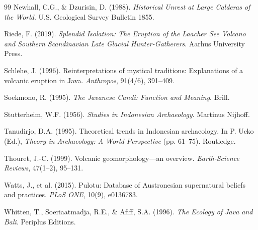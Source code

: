 \documentclass[12pt,a4paper]{article}
\begin{document}
\begin{thebibliography}{99}
Newhall, C.G., \& Dzurisin, D. (1988). \emph{Historical Unrest at Large Calderas of the World}. U.S. Geological Survey Bulletin 1855.

Riede, F. (2019). \emph{Splendid Isolation: The Eruption of the Laacher See Volcano and Southern Scandinavian Late Glacial Hunter-Gatherers}. Aarhus University Press.

Schlehe, J. (1996). Reinterpretations of mystical traditions: Explanations of a volcanic eruption in Java. \emph{Anthropos}, 91(4/6), 391--409.

Soekmono, R. (1995). \emph{The Javanese Candi: Function and Meaning}. Brill.

Stutterheim, W.F. (1956). \emph{Studies in Indonesian Archaeology}. Martinus Nijhoff.

Tanudirjo, D.A. (1995). Theoretical trends in Indonesian archaeology. In P. Ucko (Ed.), \emph{Theory in Archaeology: A World Perspective} (pp. 61--75). Routledge.

Thouret, J.-C. (1999). Volcanic geomorphology---an overview. \emph{Earth-Science Reviews}, 47(1--2), 95--131.

Watts, J., et al. (2015). Pulotu: Database of Austronesian supernatural beliefs and practices. \emph{PLoS ONE}, 10(9), e0136783.

Whitten, T., Soeriaatmadja, R.E., \& Afiff, S.A. (1996). \emph{The Ecology of Java and Bali}. Periplus Editions.

\end{thebibliography}
\end{document}
